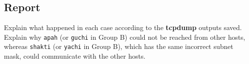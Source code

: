 \documentclass[10pt,a4paper]{article}
\numberwithin{equation}{section}
\numberwithin{figure}{section}
\numberwithin{table}{section}
\begin{document}
    \subsection*{Report}
    Explain what happened in each case according to the \textbf{tcpdump} outputs saved.
    Explain why \texttt{apah} (or \texttt{guchi} in Group B) could not be reached from other hosts, whereas \texttt{shakti} (or \texttt{yachi} in Group B), which has the same incorrect subnet mask, could communicate with the other hosts.
\end{document}
